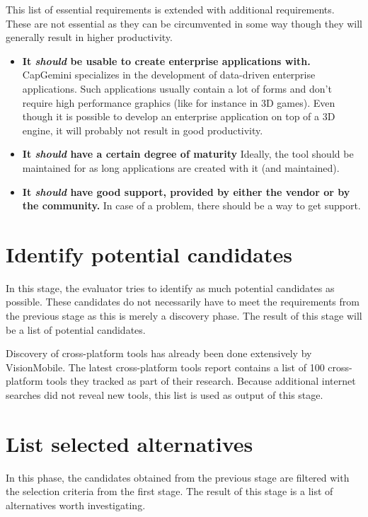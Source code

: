 This list of essential requirements is extended with additional requirements. These are not essential as they can be circumvented in some way though they will generally result in higher productivity.
    
\begin{itemize}    
    \item \textbf{It \emph{should} be usable to create enterprise applications with.} CapGemini specializes in the development of data-driven enterprise applications. Such applications usually contain a lot of forms and don't require high performance graphics (like for instance in 3D games). Even though it is possible to develop an enterprise application on top of a 3D engine, it will probably not result in good productivity.
    \item \textbf{It \emph{should} have a certain degree of maturity} Ideally, the tool should be maintained for as long applications are created with it (and maintained). 
    \item \textbf{It \emph{should} have good support, provided by either the vendor or by the community.} In case of a problem, there should be a way to get support.
\end{itemize}

\section{Identify potential candidates}

In this stage, the evaluator tries to identify as much potential candidates as possible. These candidates do not necessarily have to meet the requirements from the previous stage as this is merely a discovery phase. The result of this stage will be a list of potential candidates.

Discovery of cross-platform tools has already been done extensively by VisionMobile. The latest cross-platform tools report \cite{VMCPT:2012} contains a list of 100 cross-platform tools they tracked as part of their research. Because additional internet searches did not reveal new tools, this list is used as output of this stage.

\section{List selected alternatives}

In this phase, the candidates obtained from the previous stage are filtered with the selection criteria from the first stage. The result of this stage is a list of alternatives worth investigating.

